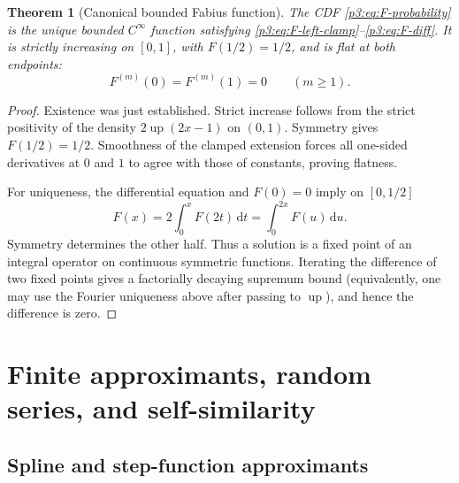 \documentclass[11pt]{article}
\numberwithin{equation}{section}
\newtheorem{theorem}{Theorem}[section]
\theoremstyle{definition}
\theoremstyle{remark}
\newcommand{\upf}{\operatorname{up}}
\newcommand{\dd}{\,\mathrm d}
\begin{document}
\begin{theorem}[Canonical bounded Fabius function]\label{p3:thm:bounded-existence}
The CDF \eqref{p3:eq:F-probability} is the unique bounded $C^\infty$ function satisfying \eqref{p3:eq:F-left-clamp}--\eqref{p3:eq:F-diff}.  It is strictly increasing on $[0,1]$, with $F(1/2)=1/2$, and is flat at both endpoints:
\begin{equation}\label{p3:eq:F-flat}
 F^{(m)}(0)=F^{(m)}(1)=0\qquad(m\ge1).
\end{equation}
\end{theorem}

\begin{proof}
Existence was just established.  Strict increase follows from the strict positivity of the density $2\upf(2x-1)$ on $(0,1)$.  Symmetry gives $F(1/2)=1/2$.  Smoothness of the clamped extension forces all one-sided derivatives at $0$ and $1$ to agree with those of constants, proving flatness.

For uniqueness, the differential equation and $F(0)=0$ imply on $[0,1/2]$
\[
 F(x)=2\int_0^xF(2t)\dd t=\int_0^{2x}F(u)\dd u.
\]
Symmetry determines the other half.  Thus a solution is a fixed point of an integral operator on continuous symmetric functions.  Iterating the difference of two fixed points gives a factorially decaying supremum bound (equivalently, one may use the Fourier uniqueness above after passing to $\upf$), and hence the difference is zero.
\end{proof}


\section{Finite approximants, random series, and self-similarity}

\subsection{Spline and step-function approximants}
\end{document}
